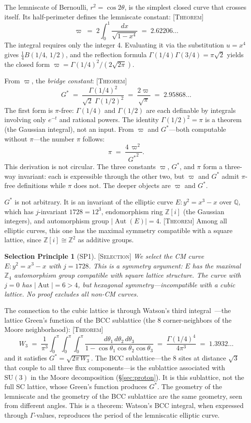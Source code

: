 \documentclass[12pt]{article}
\newcommand{\ZZ}{\mathbb{Z}}
\newcommand{\QQ}{\mathbb{Q}}
\DeclareMathOperator{\Aut}{Aut}
\newcommand{\etag}[1]{{\normalfont\textsc{\footnotesize [#1]}}}
\theoremstyle{compact}
\begin{document}
The lemniscate of Bernoulli, $r^2 = \cos 2\theta$, is the simplest closed curve that crosses itself. Its half-perimeter defines the lemniscate constant: \etag{Theorem}
\[
\varpi \;=\; 2\int_0^1 \frac{dx}{\sqrt{1 - x^4}} \;=\; 2.62206\ldots
\]
The integral requires only the integer 4. Evaluating it via the substitution $u = x^4$ gives $\tfrac{1}{4}B(1/4,\,1/2)$, and the reflection formula $\Gamma(1/4)\Gamma(3/4) = \pi\sqrt{2}$ yields the closed form $\varpi = \Gamma(1/4)^2 / (2\sqrt{2\pi})$.

From $\varpi$, the \emph{bridge constant}: \etag{Theorem}
\[
{G^{*}} \;=\; \frac{\Gamma(1/4)^2}{\sqrt{2}\;\Gamma(1/2)^2} \;=\; \frac{2\varpi}{\sqrt{\pi}} \;=\; 2.95868\ldots
\]
The first form is $\pi$-free: $\Gamma(1/4)$ and $\Gamma(1/2)$ are each definable by integrals involving only $e^{-t}$ and rational powers. The identity $\Gamma(1/2)^2 = \pi$ is a theorem (the Gaussian integral), not an input. From $\varpi$ and ${G^{*}}$---both computable without $\pi$---the number $\pi$ follows:
\[
\pi \;=\; \frac{4\,\varpi^2}{{G^{*}}^2}.
\]
This derivation is not circular. The three constants $\varpi$, ${G^{*}}$, and $\pi$ form a three-way invariant: each is expressible through the other two, but $\varpi$ and ${G^{*}}$ admit $\pi$-free definitions while $\pi$ does not. The deeper objects are $\varpi$ and ${G^{*}}$.

${G^{*}}$ is not arbitrary. It is an invariant of the elliptic curve $E: y^2 = x^3 - x$ over $\QQ$, which has $j$-invariant $1728 = 12^3$, endomorphism ring $\ZZ[i]$ (the Gaussian integers), and automorphism group $|\Aut(E)| = 4$. \etag{Theorem} Among all elliptic curves, this one has the maximal symmetry compatible with a square lattice, since $\ZZ[i] \cong \ZZ^2$ as additive groups.

\smallskip
\noindent\textbf{Selection Principle 1} (SP1). \etag{Selection} \textit{We select the CM curve $E: y^2 = x^3 - x$ with $j = 1728$. This is a symmetry argument: $E$ has the maximal $\ZZ_4$ automorphism group compatible with square lattice structure. The curve with $j = 0$ has $|\Aut| = 6 > 4$, but hexagonal symmetry---incompatible with a cubic lattice. No proof excludes all non-CM curves.}

\smallskip

The connection to the cubic lattice is through Watson's third integral~\cite{watson}---the lattice Green's function of the BCC sublattice (the 8 corner-neighbors of the Moore neighborhood): \etag{Theorem}
\[
W_3 \;=\; \frac{1}{\pi^3}\int_0^\pi\!\!\int_0^\pi\!\!\int_0^\pi \frac{d\theta_1\,d\theta_2\,d\theta_3}{1 - \cos\theta_1\cos\theta_2\cos\theta_3} \;=\; \frac{\Gamma(1/4)^4}{4\pi^3} \;=\; 1.3932\ldots
\]
and it satisfies ${G^{*}} = \sqrt{2\pi\,W_3}$. The BCC sublattice---the 8 sites at distance $\sqrt{3}$ that couple to all three flux components---is the sublattice associated with $\mathrm{SU}(3)$ in the Moore decomposition (\S\ref{sec:proton}). It is this sublattice, not the full SC lattice, whose Green's function produces ${G^{*}}$. The geometry of the lemniscate and the geometry of the BCC sublattice are the same geometry, seen from different angles. This is a theorem: Watson's BCC integral, when expressed through $\Gamma$-values, reproduces the period of the lemniscatic elliptic curve.
\end{document}
